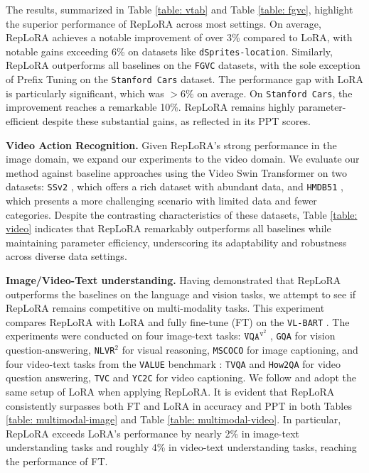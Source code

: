 

The results, summarized in Table \ref{table: vtab} and Table \ref{table: fgvc}, highlight the superior performance of RepLoRA across most settings. On average, RepLoRA achieves a notable improvement of over 3\% compared to LoRA, with notable gains exceeding 6\% on datasets like \texttt{dSprites-location}. Similarly, RepLoRA outperforms all baselines on the \texttt{FGVC} datasets, with the sole exception of Prefix Tuning on the \texttt{Stanford Cars} dataset. The performance gap with LoRA is particularly significant, which was $>6\%$ on average. On \texttt{Stanford Cars}, the improvement reaches a remarkable 10\%. RepLoRA remains highly parameter-efficient despite these substantial gains, as reflected in its PPT scores.




\vspace{0.5 em}
\noindent
\textbf{Video Action Recognition. } Given RepLoRA's strong performance in the image domain, we expand our experiments to the video domain. We evaluate our method against baseline approaches using the Video Swin Transformer on two datasets: \texttt{SSv2} \cite{ssv2}, which offers a rich dataset with abundant data, and \texttt{HMDB51} \cite{hmdb51}, which presents a more challenging scenario with limited data and fewer categories. Despite the contrasting characteristics of these datasets, Table \ref{table: video} indicates that RepLoRA remarkably outperforms all baselines while maintaining parameter efficiency, underscoring its adaptability and robustness across diverse data settings.

\vspace{0.5 em}
\noindent
\textbf{Image/Video-Text understanding. } Having demonstrated that RepLoRA outperforms the baselines on the language and vision tasks, we attempt to see if RepLoRA remains competitive on multi-modality tasks. This experiment compares RepLoRA with LoRA and fully fine-tune (FT) on the \texttt{VL-BART} \cite{bart}. The experiments were conducted on four image-text tasks: $\texttt{VQA}^{\texttt{v}^2}$ \cite{vqa}, \texttt{GQA} \cite{gqa} for vision question-answering, \texttt{NLVR$^2$} \cite{nlvr} for visual reasoning, \texttt{MSCOCO} \cite{mscoco} for image captioning, and four video-text tasks from the \texttt{VALUE} benchmark \cite{value}: \texttt{TVQA} \cite{tvqa} and \texttt{How2QA} \cite{how2qa} for video question answering, \texttt{TVC} \cite{tvc} and \texttt{YC2C} \cite{yc2c} for video captioning. We follow \cite{sungmultimodal} and adopt the same setup of LoRA when applying RepLoRA. It is evident that RepLoRA consistently surpasses both FT and LoRA in accuracy and PPT in both Tables \ref{table: multimodal-image} and Table \ref{table: multimodal-video}. In particular, RepLoRA exceeds LoRA’s performance by nearly 2\% in image-text understanding tasks and roughly 4\% in video-text understanding tasks, reaching the performance of FT.

